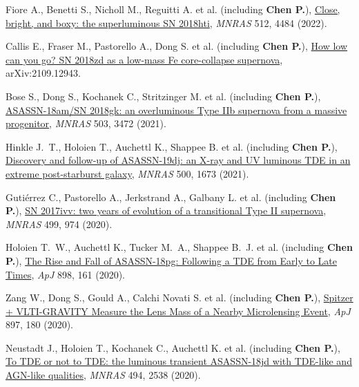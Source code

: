 \item Fiore A., Benetti S., Nicholl M., Reguitti A. et al. (including \textbf{Chen P.}), \href{https://ui.adsabs.harvard.edu/abs/2022MNRAS.512.4484F}{Close, bright, and boxy: the superluminous SN 2018hti}, \textit{MNRAS} 512, 4484 (2022).

\item Callis E., Fraser M., Pastorello A., Dong S. et al. (including \textbf{Chen P.}), \href{https://ui.adsabs.harvard.edu/abs/2021arXiv210912943C}{How low can you go? SN 2018zd as a low-mass Fe core-collapse supernova}, arXiv:2109.12943.

\item Bose S., Dong S., Kochanek C., Stritzinger M. et al. (including \textbf{Chen P.}), \href{https://ui.adsabs.harvard.edu/abs/2021MNRAS.503.3472B}{ASASSN-18am/SN 2018gk: an overluminous Type IIb supernova from a massive progenitor}, \textit{MNRAS} 503, 3472 (2021).

\item Hinkle J.~T., Holoien T., Auchettl K., Shappee B. et al. (including \textbf{Chen P.}), \href{https://ui.adsabs.harvard.edu/abs/2021MNRAS.500.1673H}{Discovery and follow-up of ASASSN-19dj: an X-ray and UV luminous TDE in an extreme post-starburst galaxy}, \textit{MNRAS} 500, 1673 (2021).

\item Guti{\'e}rrez C., Pastorello A., Jerkstrand A., Galbany L. et al. (including \textbf{Chen P.}), \href{https://ui.adsabs.harvard.edu/abs/2020MNRAS.499..974G}{SN 2017ivv: two years of evolution of a transitional Type II supernova}, \textit{MNRAS} 499, 974 (2020).

\item Holoien T.~W., Auchettl K., Tucker M.~A., Shappee B.~J. et al. (including \textbf{Chen P.}), \href{https://ui.adsabs.harvard.edu/abs/2020ApJ...898..161H}{The Rise and Fall of ASASSN-18pg: Following a TDE from Early to Late Times}, \textit{ApJ} 898, 161 (2020).

\item Zang W., Dong S., Gould A., Calchi Novati S. et al. (including \textbf{Chen P.}), \href{https://ui.adsabs.harvard.edu/abs/2020ApJ...897..180Z}{Spitzer + VLTI-GRAVITY Measure the Lens Mass of a Nearby Microlensing Event}, \textit{ApJ} 897, 180 (2020).

\item Neustadt J., Holoien T., Kochanek C., Auchettl K. et al. (including \textbf{Chen P.}), \href{https://ui.adsabs.harvard.edu/abs/2020MNRAS.494.2538N}{To TDE or not to TDE: the luminous transient ASASSN-18jd with TDE-like and AGN-like qualities}, \textit{MNRAS} 494, 2538 (2020).

